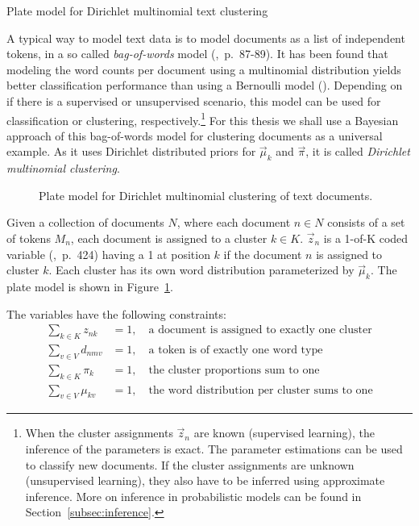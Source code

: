 \begin{Example} Plate model for Dirichlet multinomial text clustering
\label{ex:clustering-pm}

A typical way to model text data is to model documents as a list of independent tokens, in a so called \emph{bag-of-words} model (\cite{murphy2012machine},~p.~87-89). It has been found that modeling the word counts per document using a multinomial distribution yields better classification performance than using a Bernoulli model (\cite{mccallum1998comparison}). Depending on if there is a supervised or unsupervised scenario, this model can be used for classification or clustering, respectively.\footnote{When the cluster assignments $\vec z_n$ are known (supervised learning), the inference of the parameters is exact. The parameter estimations can be used to classify new documents. If the cluster assignments are unknown (unsupervised learning), they also have to be inferred using approximate inference. More on inference in probabilistic models can be found in Section~\ref{subsec:inference}.} For this thesis we shall use a Bayesian approach of this bag-of-words model for clustering documents as a universal example. As it uses Dirichlet distributed priors for $\vec \mu_k$ and $\vec \pi$, it is called \emph{Dirichlet multinomial clustering}.

\begin{figure}[t]
	\begin{center}
    	\scalebox{\tikzScale}{\adjustTikzSize }
	\end{center}
\caption[Plate model for Dirichlet multinomial clustering of text documents]{Plate model for Dirichlet multinomial clustering of text documents.}
		\label{fig:clustering_platemodel}
\end{figure}

Given a collection of documents $N$, where each document $n \in N$ consists of a set of tokens $M_n$, each document is assigned to a cluster $k \in K$. $\vec z_{n}$ is a 1-of-K coded variable (\cite{bishop2006pattern},~p.~424) having a 1 at position $k$ if the document $n$ is assigned to cluster $k$. Each cluster has its own word distribution parameterized by $\vec \mu_k$. The plate model is shown in Figure~\ref{fig:clustering_platemodel}.

The variables have the following constraints:
\begin{align}
\sum_{k \in K} z_{nk} &= 1,\quad \text{a document is assigned to exactly one cluster}\\
\sum_{v \in V} d_{nmv} &= 1,\quad \text{a token is of exactly one word type}\\
\sum_{k \in K} \pi_{k} &= 1,\quad \text{the cluster proportions sum to one}\\
\sum_{v \in V} \mu_{kv} &= 1,\quad \text{the word distribution per cluster sums to one}
\end{align}


\end{Example}
